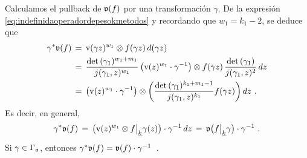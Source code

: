 \begin{obsPullbackDeUnoForma}\label{obs:pullbackdeunoforma}
	Calculamos el pullback de $\frak{v}(f)$ por una transformaci\'{o}n
	$\gamma$. De la expresi\'{o}n
	\eqref{eq:indefinidaoperadordepesokmetodos} y recordando que
	$w_{1}=k_{1}-2$, se deduce que
	\begin{align*}
		\gamma^{*}\frak{v}(f) & \,=\, \mathrm{v}(\gamma z)^{w_{1}}
			\otimes	f(\gamma z)\,d(\gamma z) \\
		& \,=\, \frac{\det(\gamma_{1})^{w_{1}+m_{1}}}{%
				j(\gamma_{1},z)^{w_{1}}}
			\,\big(\mathrm{v}(z)^{w_{1}}\cdot\gamma^{-1}\big)
				\otimes f(\gamma z)\,
			\frac{\det(\gamma_{1})}{j(\gamma_{1},z)^{2}}\,dz \\
		& \,=\,\big(\mathrm{v}(z)^{w_{1}}\cdot\gamma^{-1}\big)
			\otimes\bigg(
			\frac{\det(\gamma_{1})^{k_{1}+m_{1}-1}}{%
				j(\gamma_{1},z)^{k_{1}}}f(\gamma z)\bigg)\,dz
		\text{ .}
	\end{align*}
	Es decir, en general,
	\begin{equation}
		\label{eq:pullbackdeunoforma}
		\gamma^{*}\frak{v}(f) \,=\,\big(
			\mathrm{v}(z)^{w_{1}}\otimes
				f\operadormatrices{\peso{k}}{%
				\gamma}(z)\big)\cdot\gamma^{-1}\,dz \,=\,
			\frak{v}\big(f\operadormatrices{\peso{k}}{\gamma}\big)
				\cdot\gamma^{-1}
		\text{ .}
	\end{equation}
	Si $\gamma\in\Gamma_{\frak{a}}$, entonces
	\begin{math}
		\gamma^{*}\frak{v}(f) =\frak{v}(f)\cdot\gamma^{-1}
	\end{math}~.
\end{obsPullbackDeUnoForma}


